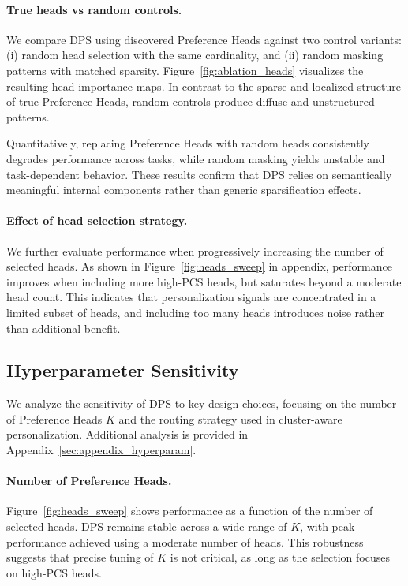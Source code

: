 \documentclass[11pt]{article}
\begin{document}
\paragraph{True heads vs random controls.}
We compare DPS using discovered Preference Heads against two control variants:
(i) random head selection with the same cardinality, and
(ii) random masking patterns with matched sparsity.
Figure~\ref{fig:ablation_heads} visualizes the resulting head importance maps.
In contrast to the sparse and localized structure of true Preference Heads, random controls produce diffuse and unstructured patterns.

Quantitatively, replacing Preference Heads with random heads consistently degrades performance across tasks, while random masking yields unstable and task-dependent behavior.
These results confirm that DPS relies on semantically meaningful internal components rather than generic sparsification effects.

\paragraph{Effect of head selection strategy.}
We further evaluate performance when progressively increasing the number of selected heads.
As shown in Figure~\ref{fig:heads_sweep} in appendix, performance improves when including more high-PCS heads, but saturates beyond a moderate head count.
This indicates that personalization signals are concentrated in a limited subset of heads, and including too many heads introduces noise rather than additional benefit.



\subsection{Hyperparameter Sensitivity}
\label{sec:hyperparam}

We analyze the sensitivity of DPS to key design choices, focusing on the number of Preference Heads $K$ and the routing strategy used in cluster-aware personalization. Additional analysis is provided in Appendix~\ref{sec:appendix_hyperparam}.

\paragraph{Number of Preference Heads.}
Figure~\ref{fig:heads_sweep} shows performance as a function of the number of selected heads.
DPS remains stable across a wide range of $K$, with peak performance achieved using a moderate number of heads.
This robustness suggests that precise tuning of $K$ is not critical, as long as the selection focuses on high-PCS heads.
\end{document}
